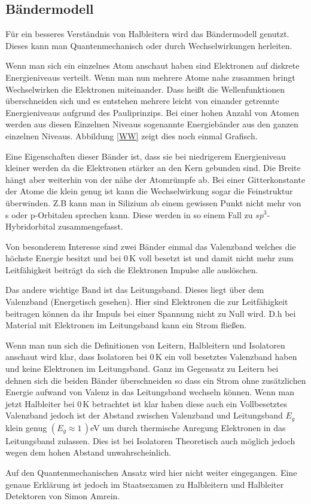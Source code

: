\subsection{Bändermodell}
Für ein besseres Verständnis von Halbleitern wird das Bändermodell genutzt. Dieses kann man Quantenmechanisch oder durch Wechselwirkungen herleiten.\par 
Wenn man sich ein einzelnes Atom anschaut haben sind Elektronen auf diskrete  Energieniveaus verteilt. Wenn man nun mehrere Atome nahe zusammen bringt Wechselwirken die Elektronen miteinander. Dass heißt die Wellenfunktionen überschneiden sich und es entstehen mehrere leicht von einander getrennte Energieniveaus aufgrund des Pauliprinzips. Bei einer hohen Anzahl von Atomen werden aus diesen Einzelnen Niveaus sogenannte Energiebänder aus den ganzen einzelnen Niveaus.
Abbildung \ref{WW} zeigt dies noch einmal Grafisch.\par
Eine Eigenschaften dieser Bänder ist, dass sie bei niedrigerem Energieniveau kleiner werden da die Elektronen stärker an den Kern gebunden sind. Die Breite hängt aber weiterhin von der nähe der Atomrümpfe ab. Bei einer Gitterkonstante der Atome die klein genug ist kann die Wechselwirkung sogar die Feinstruktur überwinden. Z.B kann man in Silizium ab einem gewissen Punkt nicht mehr von s oder p-Orbitalen sprechen kann. Diese werden in so einem Fall zu $sp^3$-Hybridorbital zusammengefasst.\par
Von besonderem Interesse sind zwei Bänder einmal das Valenzband welches die höchste Energie besitzt und bei $0$\,K voll besetzt ist und damit nicht mehr zum Leitfähigkeit beiträgt da sich die Elektronen Impulse alle auslöschen.\par
Das andere wichtige Band ist das Leitungsband. Dieses liegt über dem Valenzband (Energetisch gesehen). Hier sind Elektronen die zur Leitfähigkeit beitragen können da ihr Impuls bei einer Spannung nicht zu Null wird. D.h bei Material mit Elektronen im Leitungsband kann ein Strom fließen.\par
Wenn man nun sich die Definitionen von Leitern, Halbleitern und Isolatoren anschaut wird klar, dass Isolatoren bei $0\,$K ein voll besetztes Valenzband haben und keine Elektronen im Leitungsband. Ganz im Gegensatz zu Leitern bei dehnen sich die beiden Bänder überschneiden so dass ein Strom ohne zusätzlichen Energie aufwand von Valenz in das Leitungsband wechseln können. Wenn man jetzt Halbleiter bei $0$\,K betrachtet ist klar haben diese auch ein Vollbesetztes Valenzband jedoch ist der Abstand zwischen Valenzband und Leitungsband $E_g$ klein genug $(E_g\approx1\,)$eV um durch thermische Anregung Elektronen in das Leitungsband zulassen. Dies ist bei Isolatoren Theoretisch auch möglich jedoch wegen dem hohen Abstand unwahrscheinlich.\par
Auf den Quantenmechanischen Ansatz wird hier nicht weiter eingegangen. Eine genaue Erklärung ist jedoch im Staatsexamen zu Halbleitern und Halbleiter Detektoren von Simon Amrein.  \cite{Staatsexamen}\\
